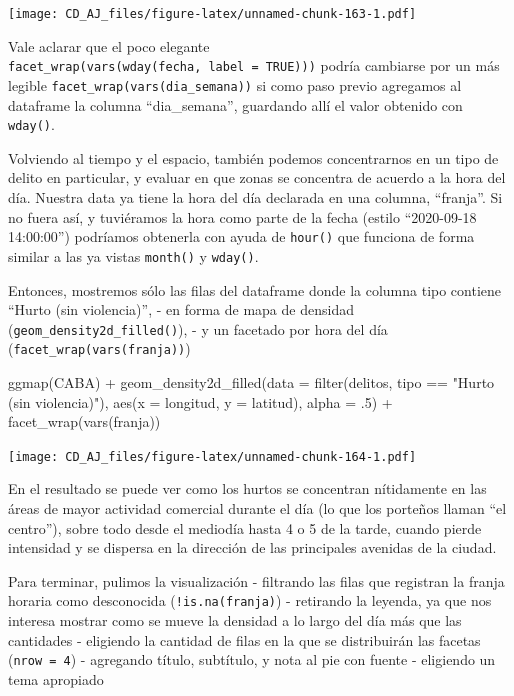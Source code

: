 \documentclass[
]{book}
\newenvironment{Shaded}{\begin{snugshade}}{\end{snugshade}}
\newcommand{\AttributeTok}[1]{\textcolor[rgb]{0.77,0.63,0.00}{#1}}
\newcommand{\DecValTok}[1]{\textcolor[rgb]{0.00,0.00,0.81}{#1}}
\newcommand{\FunctionTok}[1]{\textcolor[rgb]{0.00,0.00,0.00}{#1}}
\newcommand{\NormalTok}[1]{#1}
\newcommand{\SpecialCharTok}[1]{\textcolor[rgb]{0.00,0.00,0.00}{#1}}
\newcommand{\StringTok}[1]{\textcolor[rgb]{0.31,0.60,0.02}{#1}}
\begin{document}
\texttt{[image: CD\_AJ\_files/figure-latex/unnamed-chunk-163-1.pdf]}

Vale aclarar que el poco elegante \texttt{facet\_wrap(vars(wday(fecha,\ label\ =\ TRUE)))} podría cambiarse por un más legible \texttt{facet\_wrap(vars(dia\_semana))} si como paso previo agregamos al dataframe la columna ``dia\_semana'', guardando allí el valor obtenido con \texttt{wday()}.

Volviendo al tiempo y el espacio, también podemos concentrarnos en un tipo de delito en particular, y evaluar en que zonas se concentra de acuerdo a la hora del día. Nuestra data ya tiene la hora del día declarada en una columna, ``franja''. Si no fuera así, y tuviéramos la hora como parte de la fecha (estilo ``2020-09-18 14:00:00'') podríamos obtenerla con ayuda de \texttt{hour()} que funciona de forma similar a las ya vistas \texttt{month()} y \texttt{wday()}.

Entonces, mostremos sólo las filas del dataframe donde la columna tipo contiene ``Hurto (sin violencia)'',
- en forma de mapa de densidad (\texttt{geom\_density2d\_filled()}),
- y un facetado por hora del día (\texttt{facet\_wrap(vars(franja))})

\begin{Shaded}
\begin{Highlighting}[]
\FunctionTok{ggmap}\NormalTok{(CABA) }\SpecialCharTok{+}
    \FunctionTok{geom\_density2d\_filled}\NormalTok{(}\AttributeTok{data =} \FunctionTok{filter}\NormalTok{(delitos, tipo }\SpecialCharTok{==} \StringTok{"Hurto (sin violencia)"}\NormalTok{),}
               \FunctionTok{aes}\NormalTok{(}\AttributeTok{x =}\NormalTok{ longitud, }\AttributeTok{y =}\NormalTok{ latitud), }\AttributeTok{alpha =}\NormalTok{ .}\DecValTok{5}\NormalTok{) }\SpecialCharTok{+}
    \FunctionTok{facet\_wrap}\NormalTok{(}\FunctionTok{vars}\NormalTok{(franja))}
\end{Highlighting}
\end{Shaded}

\texttt{[image: CD\_AJ\_files/figure-latex/unnamed-chunk-164-1.pdf]}

En el resultado se puede ver como los hurtos se concentran nítidamente en las áreas de mayor actividad comercial durante el día (lo que los porteños llaman ``el centro''), sobre todo desde el mediodía hasta 4 o 5 de la tarde, cuando pierde intensidad y se dispersa en la dirección de las principales avenidas de la ciudad.

Para terminar, pulimos la visualización
- filtrando las filas que registran la franja horaria como desconocida (\texttt{!is.na(franja)})
- retirando la leyenda, ya que nos interesa mostrar como se mueve la densidad a lo largo del día más que las cantidades
- eligiendo la cantidad de filas en la que se distribuirán las facetas (\texttt{nrow\ =\ 4})
- agregando título, subtítulo, y nota al pie con fuente
- eligiendo un tema apropiado
\end{document}
